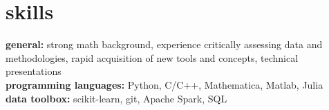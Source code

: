 \documentclass[]{friggeri-cv} %
\begin{document}
\section{skills}
\textbf{general:} strong math background, experience critically assessing data and methodologies, rapid acquisition of new tools and concepts, technical presentations \\ 
\textbf{programming languages:} Python, C/C++, Mathematica, Matlab, Julia\\
\textbf{data toolbox:} scikit-learn, git, Apache Spark, SQL

\newpage

%


\end{document}
